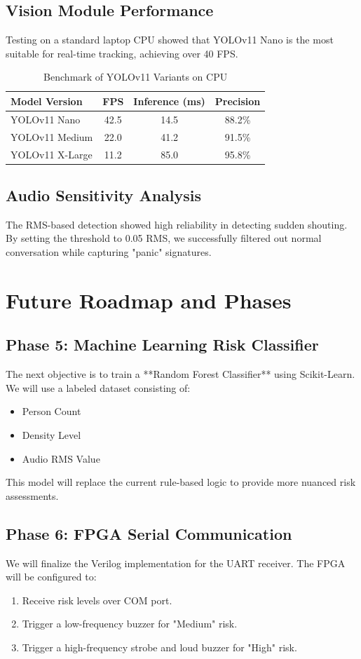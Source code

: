\documentclass[12pt,oneside,a4paper]{book}
\begin{document}
\section{Vision Module Performance}
Testing on a standard laptop CPU showed that YOLOv11 Nano is the most suitable for real-time tracking, achieving over 40 FPS.

\begin{table}[H]
\centering
\begin{tabular}{|l|c|c|c|}
\hline
\textbf{Model Version} & \textbf{FPS} & \textbf{Inference (ms)} & \textbf{Precision} \\
\hline
YOLOv11 Nano & 42.5 & 14.5 & 88.2\% \\
YOLOv11 Medium & 22.0 & 41.2 & 91.5\% \\
YOLOv11 X-Large & 11.2 & 85.0 & 95.8\% \\
\hline
\end{tabular}
\caption{Benchmark of YOLOv11 Variants on CPU}
\end{table}

\section{Audio Sensitivity Analysis}
The RMS-based detection showed high reliability in detecting sudden shouting. By setting the threshold to 0.05 RMS, we successfully filtered out normal conversation while capturing "panic" signatures.

\chapter{Future Roadmap and Phases}

\section{Phase 5: Machine Learning Risk Classifier}
The next objective is to train a **Random Forest Classifier** using Scikit-Learn. We will use a labeled dataset consisting of:
\begin{itemize}
    \item Person Count
    \item Density Level
    \item Audio RMS Value
\end{itemize}
This model will replace the current rule-based logic to provide more nuanced risk assessments.

\section{Phase 6: FPGA Serial Communication}
We will finalize the Verilog implementation for the UART receiver. The FPGA will be configured to:
\begin{enumerate}
    \item Receive risk levels over COM port.
    \item Trigger a low-frequency buzzer for "Medium" risk.
    \item Trigger a high-frequency strobe and loud buzzer for "High" risk.
\end{enumerate}
\end{document}
